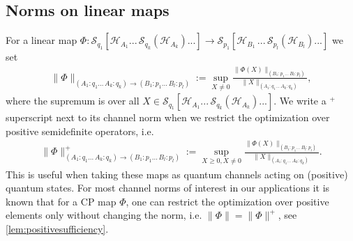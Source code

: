 \documentclass[11pt]{article}
\newcommand{\1}{\ensuremath{\mathbbm{1}}}
\theoremstyle{newdefinition}
\theoremstyle{newplain}
\theoremstyle{myplain}
\begin{document}
\subsection{Norms on linear maps}\label{subsec:Norms.on.linear.spaces}
For a linear map $\Phi: \mathcal{S}_{q_1}[\mathcal{H}_{A_1}...\,\mathcal{S}_{q_k}(\mathcal{H}_{A_k})...]\to \mathcal{S}_{p_1}[\mathcal{H}_{B_1}\,...\,\mathcal{S}_{p_l}(\mathcal{H}_{B_l})...]$ we set 
\begin{align}
    \|\Phi\|_{(A_1:q_1...\,A_k:q_k)\to (B_1:p_1...\,B_l:p_l)}:=\sup_{X\neq 0} \frac{\|\Phi(X)\|_{(B_1:p_1...\,B_l:p_l)}}{\|X\|_{(A_1:q_1...\,A_k:q_k)}},
\end{align} where the supremum is over all $X\in \mathcal{S}_{q_1}[\mathcal{H}_{A_1}...\,\mathcal{S}_{q_k}(\mathcal{H}_{A_k})...]$.
We write a $^+$ superscript next to its channel norm when we restrict the optimization over positive semidefinite operators, i.e. 
\begin{align}
     \|\Phi\|^+_{(A_1:q_1...\,A_k:q_k)\to (B_1:p_1...\,B_l:p_l)}:=\sup_{X\geq 0, X\neq0} \frac{\|\Phi(X)\|_{(B_1:p_1...\,B_l:p_l)}}{\|X\|_{(A_1:q_1...\,A_k:q_k)}}.
\end{align} 
This is useful when taking these maps as quantum channels acting on (positive) quantum states. For most channel norms of interest in our applications it is known that for a CP map $\Phi$, one can restrict the optimization over positive elements only without changing the norm, i.e. $\|\Phi\|=\|\Phi\|^+$, see 
\cref{lem:positivesufficiency}.
\end{document}
